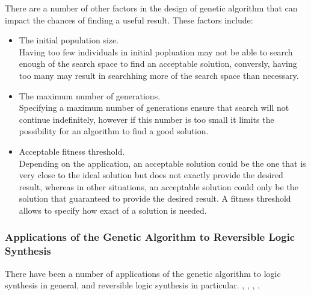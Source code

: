 There are a number of other factors in the design of genetic algorithm that can impact the chances of finding a useful result. 
These factors include:
\begin{itemize}
 \item The initial population size.
\\ Having too few individuals in initial popluation may not be able to search enough of the search space to 
find an acceptable solution, conversly, having too many may result in searchhing more of the search space than necessary.
 \item The maximum number of generations.
\\ Specifying a maximum number of generations ensure that search will not continue indefinitely, however if this number is too 
small it limits the possibility for an algorithm to find a good solution.
 \item Acceptable fitness threshold.
\\Depending on the application, an acceptable solution could be the one that is very close to the ideal solution but does not exactly provide the
desired result, whereas in other situations, an acceptable solution could only be the solution that guaranteed to provide the desired result. 
A fitness threshold allows to specify how exact of a solution is needed.  
\end{itemize}
 

\subsubsection{Applications of the Genetic Algorithm to Reversible Logic Synthesis}

There have been a number of applications of the genetic algorithm to logic synthesis in general, and reversible logic synthesis in 
particular. \cite{Lukac2003}, \cite{Lukac2008}, \cite{Khan2004}, \cite{Aguirre2003}.